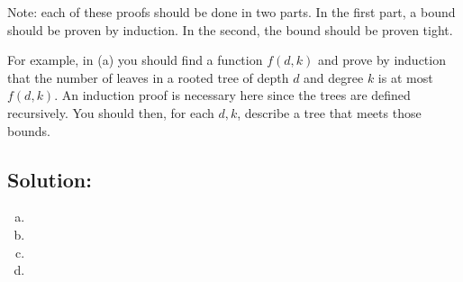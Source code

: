 \documentclass[12pt]{article}
\begin{document}
Note: each of these proofs should be done in two parts. In the first part, a bound should be proven by induction.  In the second, the bound should be proven tight.

\medskip

For example, in (a) you should find a function $f(d,k)$ and prove by induction that the number of leaves in  a rooted tree of depth $d$ and degree $k$ is at most $f(d,k).$ An induction proof is  necessary here since the trees are defined recursively.  You should then, for each $d,k$, describe a tree that meets those bounds.

\subsection*{\textbf{Solution:}}
\begin{enumerate}[(a)]
    \item
    \item 
    \item 
    \item
\end{enumerate}

\newpage
\end{document}
